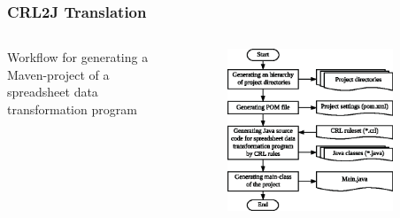 \documentclass[10pt]{beamer}
\begin{document}
\begin{frame}
\frametitle{CRL2J Translation}
\begin{columns}[t]
\small Workflow for generating a Maven-project of a spreadsheet data transformation program
\begin{figure}
\includegraphics[width=0.95\linewidth]{crl2j_wf_part1}
\end{figure}

\\~\\


\end{columns}
\end{frame}
\end{document}
